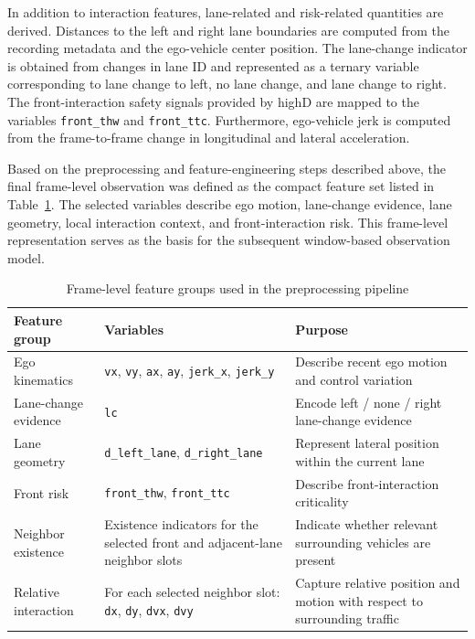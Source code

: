 \par In addition to interaction features, lane-related and risk-related quantities are derived.
Distances to the left and right lane boundaries are computed from the recording metadata and the ego-vehicle center position.
The lane-change indicator is obtained from changes in lane ID and represented as a ternary variable corresponding to lane change to left, no lane change, and lane change to right.
The front-interaction safety signals provided by highD are mapped to the variables \texttt{front\_thw} and \texttt{front\_ttc}.
Furthermore, ego-vehicle jerk is computed from the frame-to-frame change in longitudinal and lateral acceleration.

\par Based on the preprocessing and feature-engineering steps described above, the final frame-level observation was defined as the compact feature set listed in Table~\ref{tab:frame_features}. 
The selected variables describe ego motion, lane-change evidence, lane geometry, local interaction context, and front-interaction risk. 
This frame-level representation serves as the basis for the subsequent window-based observation model.


\begin{table}[htb]
    \centering
    \small
    \caption{Frame-level feature groups used in the preprocessing pipeline}
    \label{tab:frame_features}
    \begin{tabular}{p{2.9cm} p{4.8cm} p{4.6cm}}
        \toprule
        \textbf{Feature group} & \textbf{Variables} & \textbf{Purpose} \\
        \midrule
        Ego kinematics & \texttt{vx}, \texttt{vy}, \texttt{ax}, \texttt{ay}, \texttt{jerk\_x}, \texttt{jerk\_y} & Describe recent ego motion and control variation \\
        Lane-change evidence & \texttt{lc} & Encode left / none / right lane-change evidence \\
        Lane geometry & \texttt{d\_left\_lane}, \texttt{d\_right\_lane} & Represent lateral position within the current lane \\
        Front risk & \texttt{front\_thw}, \texttt{front\_ttc} & Describe front-interaction criticality \\
        Neighbor existence & Existence indicators for the selected front and adjacent-lane neighbor slots & Indicate whether relevant surrounding vehicles are present \\
        Relative interaction & For each selected neighbor slot: \texttt{dx}, \texttt{dy}, \texttt{dvx}, \texttt{dvy} & Capture relative position and motion with respect to surrounding traffic \\
        \bottomrule
    \end{tabular}
\end{table}


